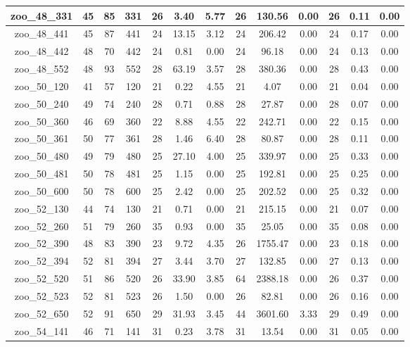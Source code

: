 \begin{landscape}
\begin{longtable}{|c|c|c|c|c|c|c|c|c|c|c|c|c|}
zoo\_48\_331 & 45 & 85 & 331 & 26 & 3.40 & 5.77 & 26 & 130.56 & 0.00 & 26 & 0.11 & 0.00 \\ \hline 
zoo\_48\_441 & 45 & 87 & 441 & 24 & 13.15 & 3.12 & 24 & 206.42 & 0.00 & 24 & 0.17 & 0.00 \\ \hline 
zoo\_48\_442 & 48 & 70 & 442 & 24 & 0.81 & 0.00 & 24 & 96.18 & 0.00 & 24 & 0.13 & 0.00 \\ \hline 
zoo\_48\_552 & 48 & 93 & 552 & 28 & 63.19 & 3.57 & 28 & 380.36 & 0.00 & 28 & 0.43 & 0.00 \\ \hline 
zoo\_50\_120 & 41 & 57 & 120 & 21 & 0.22 & 4.55 & 21 & 4.07 & 0.00 & 21 & 0.04 & 0.00 \\ \hline 
zoo\_50\_240 & 49 & 74 & 240 & 28 & 0.71 & 0.88 & 28 & 27.87 & 0.00 & 28 & 0.07 & 0.00 \\ \hline 
zoo\_50\_360 & 46 & 69 & 360 & 22 & 8.88 & 4.55 & 22 & 242.71 & 0.00 & 22 & 0.15 & 0.00 \\ \hline 
zoo\_50\_361 & 50 & 77 & 361 & 28 & 1.46 & 6.40 & 28 & 80.87 & 0.00 & 28 & 0.11 & 0.00 \\ \hline 
zoo\_50\_480 & 49 & 79 & 480 & 25 & 27.10 & 4.00 & 25 & 339.97 & 0.00 & 25 & 0.33 & 0.00 \\ \hline 
zoo\_50\_481 & 50 & 78 & 481 & 25 & 1.15 & 0.00 & 25 & 192.81 & 0.00 & 25 & 0.25 & 0.00 \\ \hline 
zoo\_50\_600 & 50 & 78 & 600 & 25 & 2.42 & 0.00 & 25 & 202.52 & 0.00 & 25 & 0.32 & 0.00 \\ \hline 
zoo\_52\_130 & 44 & 74 & 130 & 21 & 0.71 & 0.00 & 21 & 215.15 & 0.00 & 21 & 0.07 & 0.00 \\ \hline 
zoo\_52\_260 & 51 & 79 & 260 & 35 & 0.93 & 0.00 & 35 & 25.05 & 0.00 & 35 & 0.08 & 0.00 \\ \hline 
zoo\_52\_390 & 48 & 83 & 390 & 23 & 9.72 & 4.35 & 26 & 1755.47 & 0.00 & 23 & 0.18 & 0.00 \\ \hline 
zoo\_52\_394 & 52 & 81 & 394 & 27 & 3.44 & 3.70 & 27 & 132.85 & 0.00 & 27 & 0.13 & 0.00 \\ \hline 
zoo\_52\_520 & 51 & 86 & 520 & 26 & 33.90 & 3.85 & 64 & 2388.18 & 0.00 & 26 & 0.37 & 0.00 \\ \hline 
zoo\_52\_523 & 52 & 81 & 523 & 26 & 1.50 & 0.00 & 26 & 82.81 & 0.00 & 26 & 0.16 & 0.00 \\ \hline 
zoo\_52\_650 & 52 & 91 & 650 & 29 & 31.93 & 3.45 & 44 & 3601.60 & 3.33 & 29 & 0.49 & 0.00 \\ \hline 
zoo\_54\_141 & 46 & 71 & 141 & 31 & 0.23 & 3.78 & 31 & 13.54 & 0.00 & 31 & 0.05 & 0.00 \\ \hline 

\end{longtable}
\end{landscape}
